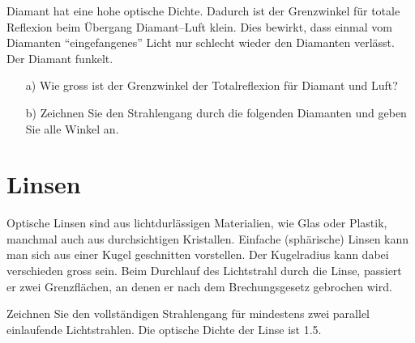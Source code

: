 \documentclass[12pt,a4paper,twoside]{article}
\begin{document}
\begin{aufgabe}
Diamant hat eine hohe optische Dichte. Dadurch ist der Grenzwinkel für totale Reflexion
beim Übergang Diamant--Luft klein.
Dies bewirkt, dass einmal vom Diamanten ``eingefangenes'' Licht nur schlecht wieder den Diamanten verlässt.
Der Diamant funkelt.
\begin{itemize}
	\item [a)] Wie gross ist der Grenzwinkel der Totalreflexion für Diamant und Luft?
	\item [b)] Zeichnen Sie den Strahlengang durch die folgenden Diamanten und geben Sie alle Winkel an.
		\begin{center}
			

\vspace*{1cm}

		\end{center}


\end{itemize}
\end{aufgabe}







\section{Linsen}

Optische Linsen sind aus lichtdurlässigen Materialien, wie Glas oder Plastik, manchmal auch aus durchsichtigen Kristallen.
Einfache (sphärische) Linsen kann man sich aus einer Kugel geschnitten vorstellen. Der Kugelradius kann dabei verschieden gross sein.
Beim Durchlauf des Lichtstrahl durch die Linse, passiert er zwei Grenzflächen, an denen er nach dem Brechungsgesetz gebrochen wird.

\begin{aufgabe}
Zeichnen Sie den vollständigen Strahlengang für mindestens zwei parallel einlaufende Lichtstrahlen.
Die optische Dichte der Linse ist \num{1.5}.
\end{aufgabe}
\end{document}
